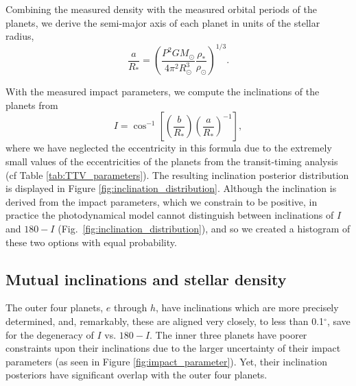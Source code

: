 \documentclass[twocolumn]{aastex63}
\begin{document}
Combining the measured density with the measured orbital periods of the planets,
we derive the semi-major axis of each planet in units of the stellar radius,
\begin{equation}
    \frac{a}{R_*} = \left(\frac{P^2 G M_\odot}{4\pi^2 R_\odot^3} \frac{\rho_*}{\rho_\odot}\right)^{1/3}.
\end{equation}

With the measured impact parameters, we compute the inclinations of the planets
from \textbf{\citep{Winn2010}}
\begin{equation}
    I = \cos^{-1}\left[ \left(\frac{b}{R_*}\right)
        \left(\frac{a}{R_*}\right)^{-1}\right],
\end{equation}
where we have neglected the eccentricity in this formula due to the extremely
small values of the eccentricities of the planets from the transit-timing
analysis (cf Table \ref{tab:TTV_parameters}).  The resulting inclination
posterior distribution is displayed in Figure \ref{fig:inclination_distribution}.
Although the inclination is derived from the impact parameters, which we constrain
to be positive, in practice the photodynamical model cannot distinguish between
inclinations of $I$ and $180-I$ (Fig.\ \ref{fig:inclination_distribution}), and so we created a histogram of these two options
with equal probability.

\subsection{Mutual inclinations and stellar density}

The outer four planets, $e$ through $h$, have inclinations which are more
precisely determined, and, remarkably, these are aligned
very closely, to less than 0.1$^\circ$, save for the degeneracy of $I$ vs.
$180-I$.  The inner three planets have poorer
constraints upon their inclinations due to the larger uncertainty of their
impact parameters (as seen in Figure \ref{fig:impact_parameter}).  Yet, their inclination posteriors have significant overlap
with the outer four planets.
\end{document}
